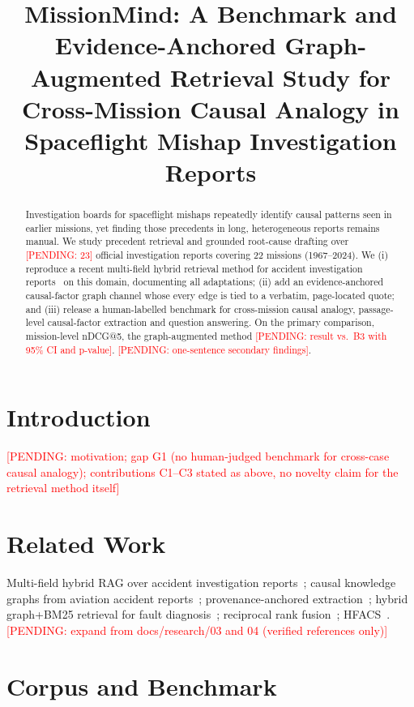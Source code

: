 \documentclass[conference]{IEEEtran}
\newcommand{\PENDING}[1]{\textcolor{red}{[PENDING: #1]}}
\begin{document}
\title{MissionMind: A Benchmark and Evidence-Anchored Graph-Augmented Retrieval Study for Cross-Mission Causal Analogy in Spaceflight Mishap Investigation Reports}
\author{\IEEEauthorblockA{\PENDING{affiliation}}}
\maketitle

\begin{abstract}
Investigation boards for spaceflight mishaps repeatedly identify causal patterns seen in earlier missions,
yet finding those precedents in long, heterogeneous reports remains manual. We study precedent retrieval and
grounded root-cause drafting over \PENDING{23} official investigation reports covering 22 missions
(1967--2024). We (i) reproduce a recent multi-field hybrid retrieval method for accident investigation
reports~\cite{kim2026} on this domain, documenting all adaptations; (ii) add an evidence-anchored causal-factor
graph channel whose every edge is tied to a verbatim, page-located quote; and (iii) release a human-labelled
benchmark for cross-mission causal analogy, passage-level causal-factor extraction and question answering.
On the primary comparison, mission-level nDCG@5, the graph-augmented method \PENDING{result vs.\ B3 with
95\% CI and p-value}. \PENDING{one-sentence secondary findings}.
\end{abstract}

\section{Introduction}
\PENDING{motivation; gap G1 (no human-judged benchmark for cross-case causal analogy); contributions C1--C3
stated as above, no novelty claim for the retrieval method itself}

\section{Related Work}
Multi-field hybrid RAG over accident investigation reports~\cite{kim2026}; causal knowledge graphs from
aviation accident reports~\cite{xiang2026}; provenance-anchored extraction~\cite{aevs2026}; hybrid graph+BM25
retrieval for fault diagnosis~\cite{xie2025}; reciprocal rank fusion~\cite{rrf}; HFACS~\cite{hfacs}.
\PENDING{expand from docs/research/03 and 04 (verified references only)}

\section{Corpus and Benchmark}
\end{document}
